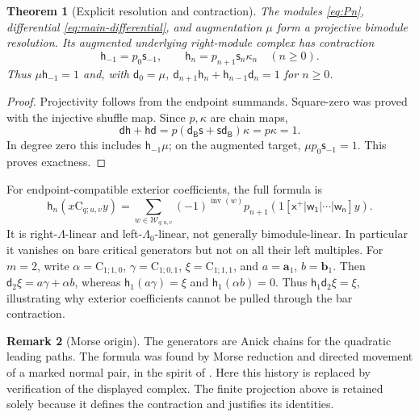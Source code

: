 \documentclass[a4paper,11pt,oneside,reqno]{amsart}
\newtheorem{theorem}{Theorem}[section]
\theoremstyle{definition}
\newtheorem{remark}[theorem]{Remark}
\numberwithin{equation}{section}
\begin{document}
\begin{theorem}[Explicit resolution and contraction]\label{thm:resolution}
The modules \eqref{eq:Pn}, differential \eqref{eq:main-differential},
and augmentation $\mu$ form a projective bimodule resolution.
Its augmented underlying right-module complex has contraction
\begin{equation}\label{eq:explicit-contraction}
 \boxed{\mathsf h_{-1}=p_0\mathsf s_{-1},\qquad
 \mathsf h_n=p_{n+1}\mathsf s_n\kappa_n\quad(n\ge0).}
\end{equation}
Thus $\mu\mathsf h_{-1}=1$ and, with $\mathsf d_0=\mu$,
$\mathsf d_{n+1}\mathsf h_n+\mathsf h_{n-1}\mathsf d_n=1$ for $n\ge0$.
\end{theorem}
\begin{proof}
Projectivity follows from the endpoint summands. Square-zero was
proved with the injective shuffle map. Since $p,\kappa$ are chain maps,
\[
 \mathsf d\mathsf h+\mathsf h\mathsf d
 =p(\mathsf d_{\mathsf B}\mathsf s+
       \mathsf s\mathsf d_{\mathsf B})\kappa=p\kappa=1.
\]
In degree zero this includes $\mathsf h_{-1}\mu$; on the augmented
target, $\mu p_0\mathsf s_{-1}=1$. This proves exactness.
\end{proof}
For endpoint-compatible exterior coefficients, the full formula is
\begin{equation}\label{eq:h-expanded}
 \mathsf h_n(x\mathrm C_{q;u,v}y)=
 \sum_{w\in\mathcal W_{q;u,v}}(-1)^{\operatorname{inv}(w)}
 p_{n+1}(1\mathsf{[x^+|w_1|\cdots|w_n]}y).
\end{equation}
It is right-$\Lambda$-linear and left-$\Lambda_0$-linear, not generally
bimodule-linear. In particular it vanishes on bare critical generators
but not on all their left multiples. For $m=2$, write
$\alpha=\mathrm C_{1;1,0}$, $\gamma=\mathrm C_{1;0,1}$,
$\xi=\mathrm C_{1;1,1}$, and $a=\mathbf a_1$, $b=\mathbf b_1$.
Then $\mathsf d_2\xi=a\gamma+\alpha b$, whereas
$\mathsf h_1(a\gamma)=\xi$ and $\mathsf h_1(\alpha b)=0$.
Thus $\mathsf h_1\mathsf d_2\xi=\xi$, illustrating why exterior
coefficients cannot be pulled through the bar contraction.

\begin{remark}[Morse origin]
The generators are Anick chains for the quadratic leading paths.
The formula was found by Morse reduction and directed movement of a
marked normal pair, in the spirit of \cite{Lopatkin}. Here this history
is replaced by verification of the displayed complex. The finite
projection above is retained solely because it defines the contraction
and justifies its identities.
\end{remark}
\end{document}
